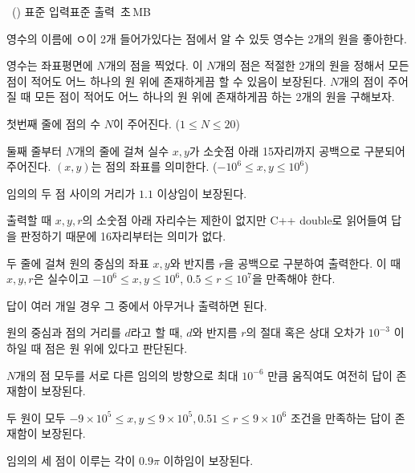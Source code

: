 \begin{problem}{\kcpcproboo\ (\kcpcprobooshort)}
    {표준 입력}{표준 출력}
    {\kcpcprobootime\,초}{\kcpcproboomemory\,MB}{}
    
    영수의 이름에 ㅇ이 2개 들어가있다는 점에서 알 수 있듯 영수는 2개의 원을 좋아한다.
    
    영수는 좌표평면에 $N$개의 점을 찍었다. 이 $N$개의 점은 적절한 2개의 원을 정해서 모든 점이 적어도 어느 하나의 원 위에 존재하게끔 할 수 있음이 보장된다. $N$개의 점이 주어질 때 모든 점이 적어도 어느 하나의 원 위에 존재하게끔 하는 2개의 원을 구해보자.
    
    \InputFile
    첫번째 줄에 점의 수 $N$이 주어진다. ($1 \le N \le 20$)
    
    둘째 줄부터 $N$개의 줄에 걸쳐 실수 $x, y$가 소숫점 아래 15자리까지 공백으로 구분되어 주어진다. $(x,y)$는 점의 좌표를 의미한다. ($ -10^6 \le x, y \le 10^6$)
    
    임의의 두 점 사이의 거리가 $1.1$ 이상임이 보장된다.
    
    출력할 때 $x, y, r$의 소숫점 아래 자리수는 제한이 없지만 C++ double로 읽어들여 답을 판정하기 때문에 16자리부터는 의미가 없다.
    
    \OutputFile
    두 줄에 걸쳐 원의 중심의 좌표 $x, y$와 반지름 $r$을 공백으로 구분하여 출력한다. 이 때 $x, y, r$은 실수이고 $-10^6 \le x, y \le 10^6$, $ 0.5 \le r \le 10^7$을 만족해야 한다.
    
    답이 여러 개일 경우 그 중에서 아무거나 출력하면 된다.
   
    \Examples
    
    \begin{example}
    \end{example}
    
    \Notes
    원의 중심과 점의 거리를 $d$라고 할 때, $d$와 반지름 $r$의 절대 혹은 상대 오차가 $10^{-3}$ 이하일 때 점은 원 위에 있다고 판단된다.
    
    $N$개의 점 모두를 서로 다른 임의의 방향으로 최대 $10^{-6}$ 만큼 움직여도 여전히 답이 존재함이 보장된다.
    
    두 원이 모두 $-9 \times 10^5 \le x, y \le 9 \times 10^5, 0.51 \le r \le 9 \times 10^6$ 조건을 만족하는 답이 존재함이 보장된다.
    
    임의의 세 점이 이루는 각이 $0.9\pi$ 이하임이 보장된다.
    
\end{problem}

